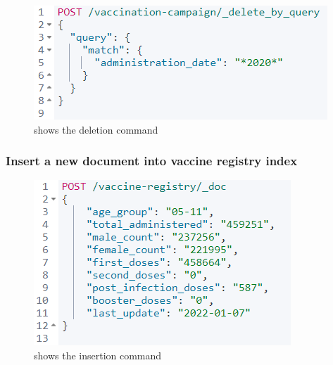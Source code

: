 \documentclass{article}[IEEEtran]
\begin{document}
\begin{figure}[H]
\begin{center}
\begin{minipage}[b]{0.4\textwidth}
    \includegraphics[width=\textwidth, frame]{Command_1.png}
  \end{minipage}
  \hfill
  \caption{shows the deletion command}
\end{center}
\end{figure}

\subsubsection{Insert a new document into vaccine registry index}

\begin{figure}[H]
\begin{center}
\begin{minipage}[b]{0.4\textwidth}
    \includegraphics[width=\textwidth, frame]{Command_2.png}
  \end{minipage}
  \hfill
  \caption{shows the insertion command}
\end{center}
\end{figure}
\end{document}

